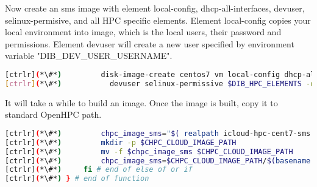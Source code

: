	Now create an sms image with element local-config, dhcp-all-interfaces, devuser, selinux-permisive, and all HPC specific elements. Element local-config copies your local environment into image, which is the local users, their password and permissions. Element devuser will create a new user specified by environment variable "DIB\_DEV\_USER\_USERNAME". 


\begin{lstlisting}[language=bash,keywords={}]
[ctrlr](*\#*)         disk-image-create centos7 vm local-config dhcp-all-interfaces \
[ctrlr](*\#*)         	devuser selinux-permissive $DIB_HPC_ELEMENTS -o icloud-hpc-cent7-sms
\end{lstlisting} 

	It will take a while to build an image. Once the image is built, copy it to standard OpenHPC path.


\begin{lstlisting}[language=bash,keywords={}]
[ctrlr](*\#*)         chpc_image_sms="$( realpath icloud-hpc-cent7-sms.qcow2)"
[ctrlr](*\#*)         mkdir -p $CHPC_CLOUD_IMAGE_PATH
[ctrlr](*\#*)         mv -f $chpc_image_sms $CHPC_CLOUD_IMAGE_PATH
[ctrlr](*\#*)         chpc_image_sms=$CHPC_CLOUD_IMAGE_PATH/$(basename $chpc_image_sms)
[ctrlr](*\#*)     fi # end of else of or if
[ctrlr](*\#*) } # end of function
\end{lstlisting} 
